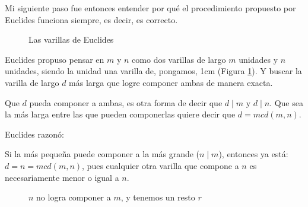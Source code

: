 \documentclass[12pt, a4paper, openany, fleqn]{book}
\begin{document}
    Mi siguiente paso fue entonces entender por qué el procedimiento propuesto por Euclides funciona siempre, es decir, es correcto.


    \begin{figure}[h]
        \centering
        \caption{Las varillas de Euclides} \label{varillas_euclides}
    \end{figure}

    Euclides propuso pensar en $m$ y $n$ como dos varillas de largo $m$ unidades y $n$ unidades, siendo la unidad una varilla de, pongamos, 1cm (Figura \ref{varillas_euclides}).
    Y buscar la varilla de largo $d$ más larga que logre componer ambas de manera exacta.

    Que $d$ pueda componer a ambas, es otra forma de decir que $d \mid m$ y $d \mid n$. Que sea la más larga entre las que pueden componerlas quiere decir que $d = mcd(m,n)$.

    Euclides razonó:

    Si la más pequeña puede componer a la más grande ($n \mid m$), entonces ya está: $d=n=mcd(m,n)$, pues cualquier otra varilla que compone a $n$ es necesariamente menor o igual a $n$.

    \begin{figure}[h]
        \centering
        \caption{$n$ no logra componer a $m$, y tenemos un resto $r$} \label{varillas_euclides_resto}
    \end{figure}
\end{document}
